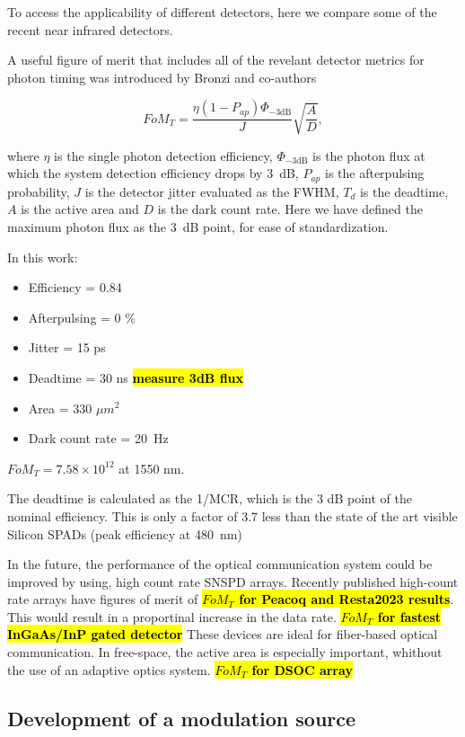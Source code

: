 \documentclass[11pt]{caltech_thesis} %
\begin{document}
To access the applicability of different detectors, here we compare some of the recent near infrared detectors.

A useful figure of merit that includes all of the revelant detector metrics for photon timing was introduced by Bronzi and co-authors \autocite{Bronzi2016}

$$FoM_T = \frac{\eta  (1 - P_{ap})\Phi_{-3 \text{dB}}}{J} \sqrt{\frac{A}{D}},$$

where $\eta$ is the single photon detection efficiency, $\Phi_{-3 \text{dB}}$ is the photon flux at which the system detection efficiency drops by 3~dB, $P_{ap}$ is the afterpulsing probability, $J$ is the detector jitter evaluated as the FWHM, $T_d$ is the deadtime, $A$ is the active area and $D$ is the dark count rate. Here we have defined the maximum photon flux as the 3~dB point, for ease of standardization.

In this work:

\begin{itemize}
\tightlist
\item
  Efficiency = 0.84
\item
  Afterpulsing = 0 \%
\item
  Jitter = 15 ps
\item
  Deadtime = 30 ns \textbf{\hl{measure 3dB flux}}
\item
  Area = 330 $\mu m^2$
\item
  Dark count rate = 20~Hz
\end{itemize}

$FoM_T = 7.58 \times 10^{12}$ at 1550 nm.

The deadtime is calculated as the 1/MCR, which is the 3 dB point of the nominal efficiency. This is only a factor of 3.7 less than the state of the art visible Silicon SPADs (peak efficiency at 480~nm) \autocite{Gramuglia2022}

In the future, the performance of the optical communication system could be improved by using, high count rate SNSPD arrays. Recently published high-count rate arrays have figures of merit of \textbf{\hl{$FoM_T$ for Peacoq and Resta2023 results}}. This would result in a proportinal increase in the data rate.
\textbf{\hl{$FoM_T$ for fastest InGaAs/InP gated detector}}
These devices are ideal for fiber-based optical communication. In free-space, the active area is especially important, whithout the use of an adaptive optics system.
\textbf{\hl{$FoM_T$ for DSOC array}}

\hypertarget{development-of-a-modulation-source}{%
\subsection{Development of a modulation source}\label{development-of-a-modulation-source}}
\end{document}
